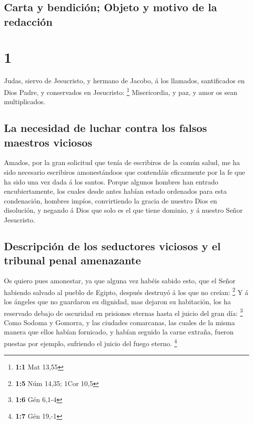 \hypertarget{carta-y-bendiciuxf3n-objeto-y-motivo-de-la-redacciuxf3n}{%
\subsection{Carta y bendición; Objeto y motivo de la
redacción}\label{carta-y-bendiciuxf3n-objeto-y-motivo-de-la-redacciuxf3n}}

\hypertarget{section}{%
\section{1}\label{section}}

 Judas, siervo de Jesucristo, y hermano de Jacobo, á los
llamados, santificados en Dios Padre, y conservados en Jesucristo:
\footnote{\textbf{1:1} Mat 13,55}  Misericordia, y paz, y
amor os sean multiplicados.

\hypertarget{la-necesidad-de-luchar-contra-los-falsos-maestros-viciosos}{%
\subsection{La necesidad de luchar contra los falsos maestros
viciosos}\label{la-necesidad-de-luchar-contra-los-falsos-maestros-viciosos}}

 Amados, por la gran solicitud que tenía de escribiros de
la común salud, me ha sido necesario escribiros amonestándoos que
contendáis eficazmente por la fe que ha sido una vez dada á los santos.
 Porque algunos hombres han entrado encubiertamente, los
cuales desde antes habían estado ordenados para esta condenación,
hombres impíos, convirtiendo la gracia de nuestro Dios en disolución, y
negando á Dios que solo es el que tiene dominio, y á nuestro Señor
Jesucristo.

\hypertarget{descripciuxf3n-de-los-seductores-viciosos-y-el-tribunal-penal-amenazante}{%
\subsection{Descripción de los seductores viciosos y el tribunal penal
amenazante}\label{descripciuxf3n-de-los-seductores-viciosos-y-el-tribunal-penal-amenazante}}

 Os quiero pues amonestar, ya que alguna vez habéis sabido
esto, que el Señor habiendo salvado al pueblo de Egipto, después
destruyó á los que no creían: \footnote{\textbf{1:5} Núm 14,35; 1Cor
  10,5}  Y á los ángeles que no guardaron su dignidad, mas
dejaron su habitación, los ha reservado debajo de oscuridad en prisiones
eternas hasta el juicio del gran día: \footnote{\textbf{1:6} Gén 6,1-4}
 Como Sodoma y Gomorra, y las ciudades comarcanas, las
cuales de la misma manera que ellos habían fornicado, y habían seguido
la carne extraña, fueron puestas por ejemplo, sufriendo el juicio del
fuego eterno. \footnote{\textbf{1:7} Gén 19,-1}

